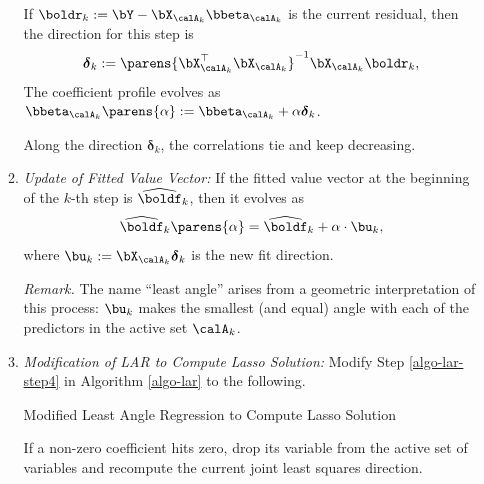 \documentclass[12pt]{article}
\begin{document}
\begin{enumerate}[label=\textbf{\arabic*.}]
\begin{enumerate}
		If $\boldr_k := \bY - \bX_{\calA_k} \bbeta_{\calA_k}$ is the current residual, then the direction for this step is 
		\begin{align*}
			\boldsymbol{\delta}_k := \parens{\bX_{\calA_k}^\top \bX_{\calA_k}}^{-1} \bX_{\calA_k} \boldr_k, 
		\end{align*}
		The coefficient profile evolves as $\bbeta_{\calA_k} \parens{\alpha} := \bbeta_{\calA_k} + \alpha \boldsymbol{\delta}_k$. 
		
		Along the direction $\boldsymbol{\delta}_k$, the correlations tie and keep decreasing. 
		
		\item \textit{Update of Fitted Value Vector:} If the fitted value vector at the beginning of the $k$-th step is $\widehat{\boldf}_k$, then it evolves as 
		\begin{align*}
			\widehat{\boldf}_k \parens{\alpha} = \widehat{\boldf}_k + \alpha \cdot \bu_k, 
		\end{align*}
		where $\bu_k := \bX_{\calA_k} \boldsymbol{\delta}_k$ is the new fit direction. 
		
		\textit{Remark.} The name ``least angle'' arises from a geometric interpretation of this process: $\bu_k$ makes the smallest (and equal) angle with each of the predictors in the active set $\calA_k$. 
		
		\item \textit{Modification of LAR to Compute Lasso Solution:} Modify Step \ref{algo-lar-step4} in Algorithm \ref{algo-lar} to the following. 
		
		\begin{minipage}{\linewidth}
			\begin{algorithm}[H]
			\caption{Modified Least Angle Regression to Compute Lasso Solution}\label{algo-modified-lar}
			\begin{algorithmic}
				\STATE If a non-zero coefficient hits zero, drop its variable from the active set of variables and recompute the current joint least squares direction. 
			\end{algorithmic}
		\end{algorithm}
		\end{minipage}
		
		\vspace{5pt}
		

\end{enumerate}
\end{enumerate}
\end{document}
